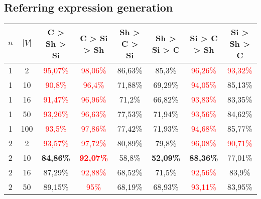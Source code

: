 \subsection{Referring expression generation}

\begin{table}[ht]
    \centering
    \begin{tabular}{cc|c|c|c|c|c|c}
        \toprule
        $n$ & $|V|$ & \textbf{C > Sh > Si}     & \textbf{C > Si > Sh}              & \textbf{Sh > C > Si}     & \textbf{Sh > Si > C}     & \textbf{Si > C > Sh}     & \textbf{Si > Sh > C}     \\\midrule
        {1} & {2}   & \textcolor{red}{95,07\%} & \textcolor{red}{98,06\%}          & {86,63\%}                & {85,3\%}                 & \textcolor{red}{96,26\%} & \textcolor{red}{93,32\%} \\
        {1} & {10}  & \textcolor{red}{90,8\%}  & \textcolor{red}{96,4\%}           & {71,88\%}                & {69,29\%}                & \textcolor{red}{94,05\%} & {85,13\%}                \\
        {1} & {16}  & \textcolor{red}{91,47\%} & \textcolor{red}{96,96\%}          & {71,2\%}                 & {66,82\%}                & \textcolor{red}{93,83\%} & {83,35\%}                \\
        {1} & {50}  & \textcolor{red}{93,26\%} & \textcolor{red}{96,63\%}          & {77,53\%}                & {71,94\%}                & \textcolor{red}{93,56\%} & {84,62\%}                \\
        {1} & {100} & \textcolor{red}{93,5\%}  & \textcolor{red}{97,86\%}          & {77,42\%}                & {71,93\%}                & \textcolor{red}{94,68\%} & {85,77\%}                \\
        {2} & {2}   & \textcolor{red}{93,57\%} & \textcolor{red}{97,72\%}          & {80,89\%}                & {79,8\%}                 & \textcolor{red}{96,08\%} & \textcolor{red}{90,71\%} \\
        {2} & {10}  & \textbf{84,86\%}         & \textcolor{red}{\textbf{92,07\%}} & {58,8\%}                 & \textbf{52,09\%}         & \textbf{88,36\%}         & {77,01\%}                \\
        {2} & {16}  & {87,29\%}                & \textcolor{red}{92,88\%}          & {68,52\%}                & {71,5\%}                 & \textcolor{red}{92,56\%} & {83,9\%}                 \\
        {2} & {50}  & {89,15\%}                & \textcolor{red}{95\%}             & {68,19\%}                & {68,93\%}                & \textcolor{red}{93,11\%} & {83,95\%}                \\

\end{tabular}
\end{table}
